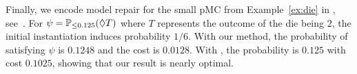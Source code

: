 Finally, we encode model repair for the small pMC from Example~\ref{ex:die} in , see~\cite{bartocci2011model}. For $\psi=\mathbb{P}_{\leq 0.125}(\lozenge T)$ where $T$ represents the outcome of the die being $2$, the initial instantiation induces probability $1/6$. With our method, the probability of satisfying $\psi$ is $0.1248$ and the cost is $0.0128$. With , the probability is $0.125$ with cost $0.1025$, showing that our result is nearly optimal.




